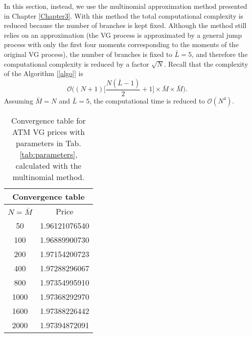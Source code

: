 In this section, instead, we use the multinomial approximation method presented in Chapter \ref{Chapter3}.%
With this method the total computational complexity is reduced because the number of branches is kept fixed.
Although the method still relies on an approximation (the VG process is approximated by a general jump process with only the first four moments corresponding to the moments of the 
original VG process),
the number of branches is fixed to $\bar L = 5$, and therefore the computational complexity is reduced by a factor $\sqrt{N}$.
Recall that the complexity of the Algorithm [\ref{algo}] is 
$$\mathcal{O}\biggl( (N+1)\bigl[\frac{N(\bar L-1)}{2}+1 \bigr] \times \bar M \times \bar M \biggr).$$
Assuming $\bar M = N$ and $\bar L = 5$, the computational time is reduced to $\mathcal{O}(N^4)$. 
\begin{table}[t!]
\centering
 \begin{tabular}{||c|c||}
 \hline
  \multicolumn{2}{|c|}{Convergence table} \\
  \hline
  $N = \bar M$ & Price \\
  \hline
    50 & 1.96121076540 \\
  \hline
    100 & 1.96889900730 \\
  \hline  
    200 &  1.97154200723 \\
  \hline
    400 & 1.97288296067 \\
  \hline   
    800 & 1.97354995910  \\
  \hline
    1000 & 1.97368292970 \\ 
  \hline
    1600 & 1.97388226442  \\
  \hline
    2000 & 1.97394872091  \\  \hline
  \end{tabular}
  \caption{Convergence table for ATM VG prices with parameters in Tab. \ref{tab:parameters}, calculated with the multinomial method.}
  \label{tab:convergence31}
\end{table}


